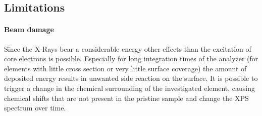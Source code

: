 
%	
%	
%	
%	
\subsection{Limitations}
\paragraph{Beam damage}
Since the X-Rays bear a considerable energy other effects than the excitation of core electrons is possible. Especially for long integration times of the analyzer (for elements with little cross section or very little surface coverage) the amount of deposited energy results in unwanted side reaction on the surface. It is possible to trigger a change in the chemical surrounding of the investigated element, causing chemical shifts that are not present in the pristine sample and change the XPS spectrum over time.

